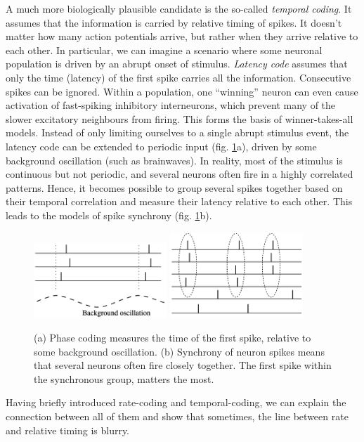 \documentclass[oneside,english,logo]{amuthesis}
\begin{document}
A much more biologically plausible candidate is the so-called \textit{temporal coding}.
It assumes that the information is carried by relative timing of spikes. It doesn't matter how many action potentials arrive, but rather when they arrive relative to each other. In particular, we can imagine a scenario where some neuronal population is driven by an abrupt onset of stimulus. \textit{Latency code} assumes that  only the time (latency) of the first spike carries all the information. Consecutive spikes can be ignored. Within a population, one ``winning'' neuron can even cause activation of fast-spiking inhibitory interneurons, which prevent many of the slower excitatory neighbours from firing. This forms the basis of  winner-takes-all models. Instead of only limiting ourselves to a single abrupt stimulus event, the latency code can be extended to periodic input (fig. \ref{fig:phase_coding}a), driven by some background oscillation (such as brainwaves). In reality, most of the stimulus is continuous but not periodic, and several neurons often fire in a highly correlated patterns. Hence, it becomes possible to group several spikes together based on their temporal correlation and measure their latency relative to each other. This leads to the models of spike synchrony (fig. \ref{fig:phase_coding}b).
\begin{figure}[!htbp]
	\centering
	\includegraphics[width=5cm]{phase coding}
	\includegraphics[width=5cm]{synchrony}
	\caption{(a) Phase coding measures the time of the first spike, relative to some background oscillation. (b) Synchrony of neuron spikes means that several neurons often fire closely together. The first spike within the synchronous group, matters the most.}
	\label{fig:phase_coding}
\end{figure}

Having briefly introduced rate-coding and temporal-coding, we can explain the connection between all of them and show that sometimes, the line between rate and relative timing is blurry.
\end{document}
